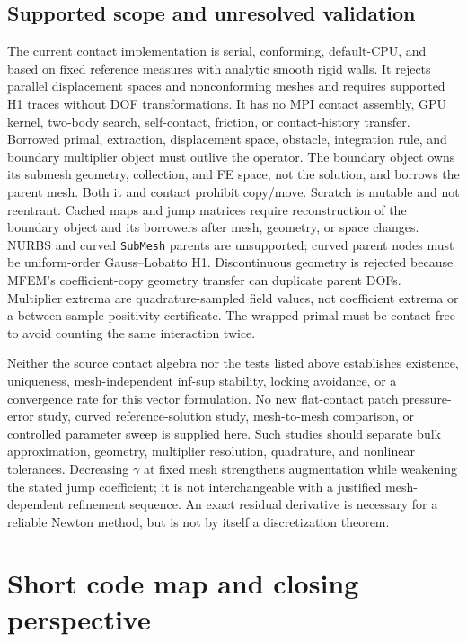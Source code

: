 \documentclass[preprint,11pt]{elsarticle}
\numberwithin{equation}{section}
\newcommand{\code}[1]{\texttt{\nolinkurl{#1}}}
\begin{document}
\subsection{Supported scope and unresolved validation}
The current contact implementation is serial, conforming, default-CPU,
and based on fixed reference measures with analytic smooth rigid walls.
It rejects parallel displacement spaces and nonconforming meshes and
requires supported H1 traces without DOF transformations. It has no MPI
contact assembly, GPU kernel, two-body search, self-contact, friction,
or contact-history transfer. Borrowed primal, extraction, displacement
space, obstacle, integration rule, and boundary multiplier object must outlive
the operator. The boundary object owns its submesh geometry, collection, and
FE space, not the solution, and borrows the parent mesh. Both it and contact
prohibit copy/move. Scratch is mutable and not reentrant. Cached maps and jump
matrices require reconstruction of the boundary object and its borrowers after
mesh, geometry, or space changes. NURBS and curved \code{SubMesh} parents are
unsupported; curved parent nodes must be uniform-order Gauss--Lobatto H1.
Discontinuous geometry is rejected because MFEM's coefficient-copy geometry
transfer can duplicate parent DOFs. Multiplier extrema
are quadrature-sampled field values, not coefficient extrema or a between-sample
positivity certificate.
The wrapped primal must be contact-free to avoid counting the same
interaction twice.

Neither the source contact algebra nor the tests listed above establishes
existence, uniqueness, mesh-independent inf-sup stability, locking
avoidance, or a convergence rate for this vector formulation. No new
flat-contact patch pressure-error study, curved reference-solution study,
mesh-to-mesh comparison, or controlled parameter sweep is supplied here.
Such studies should separate bulk approximation, geometry, multiplier
resolution, quadrature, and nonlinear tolerances. Decreasing $\gamma$
at fixed mesh strengthens augmentation while weakening the stated jump
coefficient; it is not interchangeable with a justified mesh-dependent
refinement sequence. An exact residual derivative is necessary for a
reliable Newton method, but is not by itself a discretization theorem.

\section{Short code map and closing perspective}
\label{sec:codemap}
\end{document}
